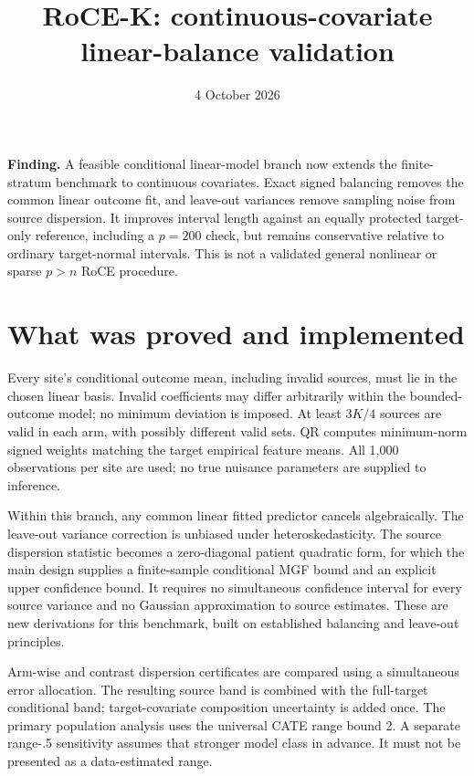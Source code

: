 \documentclass[11pt]{article}
\title{RoCE-K: continuous-covariate linear-balance validation}
\author{}\date{4 October 2026}
\begin{document}
\maketitle

\textbf{Finding.} A feasible conditional linear-model branch now extends the
finite-stratum benchmark to continuous covariates. Exact signed balancing
removes the common linear outcome fit, and leave-out variances remove
sampling noise from source dispersion. It improves interval length against
an equally protected target-only reference, including a $p=200$ check, but
remains conservative relative to ordinary target-normal intervals. This is
not a validated general nonlinear or sparse $p>n$ RoCE procedure.

\section{What was proved and implemented}

Every site's conditional outcome mean, including invalid sources, must lie
in the chosen linear basis. Invalid coefficients may differ arbitrarily
within the bounded-outcome model; no minimum deviation is imposed. At least
$3K/4$ sources are valid in each arm, with possibly different valid sets.
QR computes minimum-norm signed weights matching the target empirical feature
means. All 1,000 observations per site are used; no true nuisance parameters
are supplied to inference.

Within this branch, any common linear fitted predictor cancels algebraically.
The leave-out variance correction is unbiased under heteroskedasticity. The
source dispersion statistic becomes a zero-diagonal patient quadratic form,
for which the main design supplies a finite-sample conditional MGF bound and
an explicit upper confidence bound. It requires no simultaneous confidence
interval for every source variance and no Gaussian approximation to source
estimates. These are new derivations for this benchmark, built on established
balancing and leave-out principles.

Arm-wise and contrast dispersion certificates are compared using a simultaneous
error allocation. The resulting source band is combined with the full-target
conditional band; target-covariate composition uncertainty is added once.
The primary population analysis uses the universal CATE range bound 2.
A separate range-.5 sensitivity assumes that stronger model class in advance.
It must not be presented as a data-estimated range.
\end{document}
